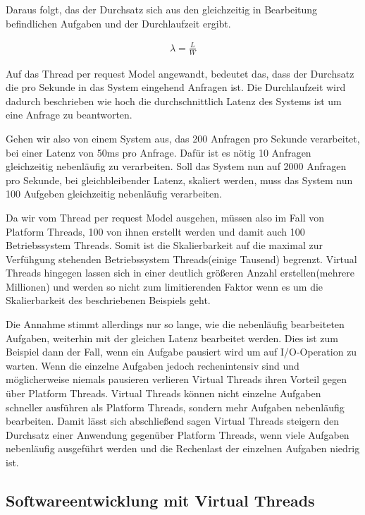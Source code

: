 \documentclass[fontsize=12pt,paper=a4,twoside=semi,parskip=half-,headsepline,headinclude]{scrreprt}
\begin{document}
Daraus folgt, das der Durchsatz sich aus den gleichzeitig in Bearbeitung befindlichen Aufgaben und der Durchlaufzeit ergibt.

\begin{eqnarray}
	\lambda = \frac{L}{W} \nonumber
\end{eqnarray}

Auf das Thread per request Model angewandt, bedeutet das, dass der Durchsatz die pro Sekunde in das System eingehend Anfragen ist. Die Durchlaufzeit wird dadurch beschrieben wie hoch die durchschnittlich Latenz des Systems ist um eine Anfrage zu beantworten. 

Gehen wir also von einem System aus, das 200 Anfragen pro Sekunde verarbeitet, bei einer Latenz von 50ms pro Anfrage. Dafür ist es nötig 10 Anfragen gleichzeitig nebenläufig zu verarbeiten. Soll das System nun auf 2000 Anfragen pro Sekunde, bei gleichbleibender Latenz, skaliert werden, muss das System nun 100  Aufgeben gleichzeitig nebenläufig verarbeiten.

Da wir vom Thread per request Model ausgehen, müssen also im Fall von  Platform Threads, 100 von ihnen erstellt werden und damit auch 100 Betriebssystem Threads. Somit ist die Skalierbarkeit auf die maximal zur Verfühgung stehenden Betriebssystem Threads(einige Tausend) begrenzt. Virtual Threads hingegen lassen sich in einer deutlich größeren Anzahl erstellen(mehrere Millionen) und werden so nicht zum limitierenden Faktor wenn es um die Skalierbarkeit des beschriebenen Beispiels geht.

Die Annahme stimmt allerdings nur so lange, wie die nebenläufig bearbeiteten Aufgaben, weiterhin mit der gleichen Latenz bearbeitet werden. Dies ist zum Beispiel dann der Fall, wenn ein Aufgabe pausiert wird um auf I/O-Operation zu warten. Wenn die einzelne Aufgaben jedoch rechenintensiv sind und möglicherweise niemals pausieren verlieren Virtual Threads ihren Vorteil gegen über Platform Threads. Virtual Threads können nicht einzelne Aufgaben schneller ausführen als Platform Threads, sondern mehr Aufgaben nebenläufig bearbeiten. Damit lässt sich abschließend sagen Virtual Threads steigern den Durchsatz einer Anwendung gegenüber Platform Threads, wenn viele Aufgaben nebenläufig ausgeführt werden und die Rechenlast der einzelnen Aufgaben niedrig ist.

\subsection{Softwareentwicklung mit Virtual Threads}
\end{document}
